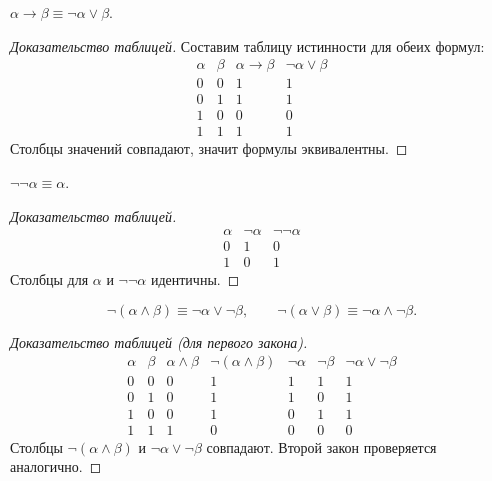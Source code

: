 \documentclass[10pt]{article}
\begin{document}
\begin{lemma}
\(\alpha \to \beta \equiv \neg\alpha \lor \beta\).
\end{lemma}
\begin{proof}[Доказательство таблицей]
Составим таблицу истинности для обеих формул:
\[
\begin{array}{cc|c|c}
\alpha & \beta & \alpha\to\beta & \neg\alpha\lor\beta \\
\hline
0 & 0 & 1 & 1 \\
0 & 1 & 1 & 1 \\
1 & 0 & 0 & 0 \\
1 & 1 & 1 & 1
\end{array}
\]
Столбцы значений совпадают, значит формулы эквивалентны.
\end{proof}

\begin{lemma}
\(\neg\neg\alpha \equiv \alpha\).
\end{lemma}
\begin{proof}[Доказательство таблицей]
\[
\begin{array}{c|c|c}
\alpha & \neg\alpha & \neg\neg\alpha \\
\hline
0 & 1 & 0 \\
1 & 0 & 1
\end{array}
\]
Столбцы для \(\alpha\) и \(\neg\neg\alpha\) идентичны.
\end{proof}

\begin{lemma}
\[
\neg(\alpha\land\beta) \equiv \neg\alpha \lor \neg\beta, \qquad
\neg(\alpha\lor\beta) \equiv \neg\alpha \land \neg\beta.
\]
\end{lemma}
\begin{proof}[Доказательство таблицей (для первого закона)]
\[
\begin{array}{cc|c|c|c|c|c}
\alpha & \beta & \alpha\land\beta & \neg(\alpha\land\beta) & \neg\alpha & \neg\beta & \neg\alpha\lor\neg\beta \\
\hline
0 & 0 & 0 & 1 & 1 & 1 & 1 \\
0 & 1 & 0 & 1 & 1 & 0 & 1 \\
1 & 0 & 0 & 1 & 0 & 1 & 1 \\
1 & 1 & 1 & 0 & 0 & 0 & 0
\end{array}
\]
Столбцы \(\neg(\alpha\land\beta)\) и \(\neg\alpha\lor\neg\beta\) совпадают. Второй закон проверяется аналогично.
\end{proof}
\end{document}
